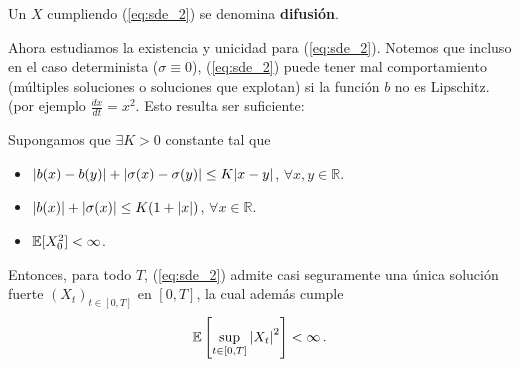 Un $X$ cumpliendo (\ref{eq:sde_2}) se denomina \textbf{difusión}. 

\newp Ahora estudiamos la existencia y unicidad  para (\ref{eq:sde_2}). Notemos que incluso en el caso determinista ($\sigma \equiv 0$), (\ref{eq:sde_2}) puede tener mal comportamiento (múltiples soluciones o soluciones que explotan) si la función $b$ no es Lipschitz. (por ejemplo $\frac{dx}{dt} = x^2$. Esto resulta ser suficiente:
\begin{theorem}
Supongamos que $\exists K >0$ constante tal que 
\begin{itemize}
    \item $\abs{b(x) - b(y)} + \abs{\sigma(x)- \sigma(y)} \le  K \abs{x-y}$, $\forall x,y \in \mathbb{R}$. 
    \item $\abs{b(x)} + \abs{\sigma(x)} \le K(1+\abs{x})$, $\forall x \in \mathbb{R}$. 
    \item $\mathbb{E}[X_{0}^{2}] < \infty$. 
\end{itemize}
Entonces, para todo $T$, (\ref{eq:sde_2}) admite casi seguramente una única solución fuerte $(X_t)_{t \in [0,T]}$ en $[0,T]$, la cual además cumple 
\begin{equation*}
    \mathbb{E} \left[ \sup_{t \in [0,T]} \abs{X_t}^2 \right] < \infty \,.
\end{equation*}
\end{theorem}

